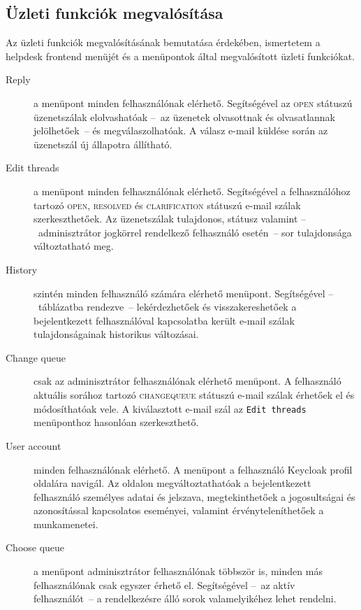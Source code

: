 \subsection{Üzleti funkciók megvalósítása}\label{sec:uzleti_funkciok}
Az üzleti funkciók megvalósításának bemutatása érdekében, ismertetem a helpdesk frontend menüjét és a menüpontok által megvalósított üzleti funkciókat.
\begin{description}
	\item[Reply] a menüpont minden felhasználónak elérhető. Segítségével az \textsc{open} státuszú üzenetszálak elolvashatóak --~az üzenetek olvasottnak és olvasatlannak jelölhetőek~-- és megválaszolhatóak.
	A válasz e-mail küldése során az üzenetszál új állapotra állítható.
	
	\item[Edit threads] a menüpont minden felhasználónak elérhető. Segítségével a felhasználóhoz tartozó \textsc{open}, \textsc{resolved} és \textsc{clarification} státuszú e-mail szálak szerkeszthetőek. Az üzenetszálak tulajdonos, státusz valamint --~adminisztrátor jogkörrel rendelkező felhasználó esetén~-- sor tulajdonsága változtatható meg.
	
	\item[History] szintén minden felhasználó számára elérhető menüpont. Segítségével --~táblázatba rendezve~-- lekérdezhetőek és visszakereshetőek a bejelentkezett felhasználóval kapcsolatba került e-mail szálak tulajdonságainak historikus változásai.		
	
	\item[Change queue] csak az adminisztrátor felhasználónak elérhető menüpont. A felhasználó aktuális sorához tartozó \textsc{change\textunderscore queue} státuszú e-mail szálak érhetőek el és módosíthatóak vele. A kiválasztott e-mail szál az \texttt{Edit~threads} menüponthoz hasonlóan szerkeszthető.
	
	
	\item[User account] minden felhasználónak elérhető. A menüpont a felhasználó Keycloak profil oldalára navigál. Az oldalon megváltoztathatóak a bejelentkezett felhasználó személyes adatai és jelszava, megtekinthetőek a jogosultságai és azonosítással kapcsolatos eseményei, valamint érvényteleníthetőek a munkamenetei.
	
	\item[Choose queue] a menüpont adminisztrátor felhasználónak többször is, minden más felhasználónak csak egyszer érhető el. Segítségével --~az aktív felhasználót~-- a rendelkezésre álló sorok valamelyikéhez lehet rendelni.
	

\end{description}
